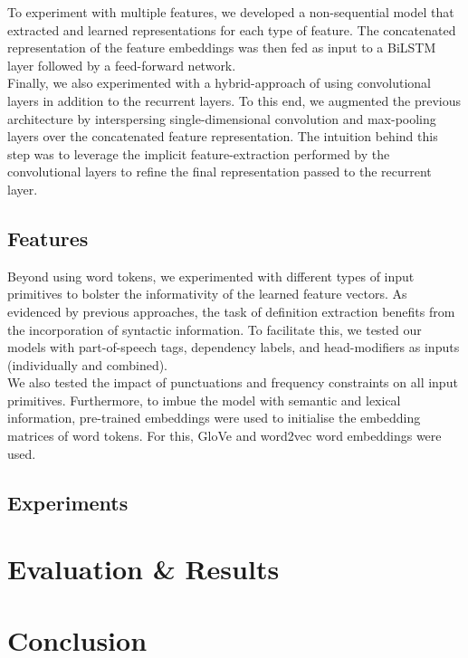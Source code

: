 \documentclass[11pt]{article}
\begin{document}
To experiment with multiple features, we developed a non-sequential model that
extracted and learned representations for each type of feature. The concatenated representation of the feature embeddings was then
fed as input to a BiLSTM layer followed by a feed-forward network.\\

Finally, we also experimented with a hybrid-approach of using
convolutional layers in addition to the recurrent layers. To this end, we augmented the previous architecture by interspersing
single-dimensional convolution and max-pooling layers over the concatenated feature representation. The intuition behind this step
was to leverage the implicit feature-extraction performed by the convolutional layers to refine the final representation passed to
the recurrent layer.


\subsection{Features}
Beyond using word tokens, we experimented with different types of input primitives to bolster the informativity of the learned
feature vectors. As evidenced by previous approaches, the task of definition extraction benefits from the incorporation of syntactic
information. To facilitate this, we tested our models with part-of-speech tags, dependency labels, and head-modifiers as inputs
(individually and combined).\\

We also tested the impact of punctuations and frequency constraints on all input primitives.
Furthermore, to imbue the model with semantic and lexical information, pre-trained embeddings were used to initialise the embedding
matrices of word tokens. For this, GloVe \cite{pennington2014glove} and word2vec \cite{mikolov2013efficient} word embeddings were used.


\subsection{Experiments}


\section{Evaluation \& Results}


\section{Conclusion}
\end{document}
